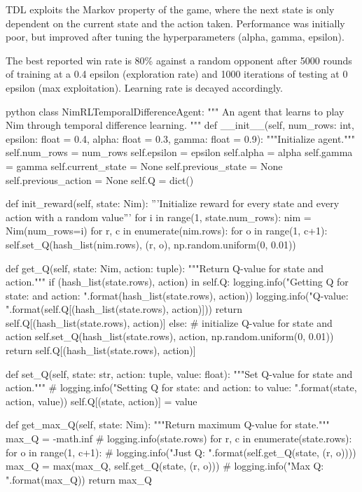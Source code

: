 TDL exploits the Markov property of the game, where the next state is only dependent on the current state and the action taken. Performance was initially poor, but improved after tuning the hyperparameters (alpha, gamma, epsilon).

The best reported win rate is 80\% against a random opponent after 5000 rounds of training at a 0.4 epsilon (exploration rate) and 1000 iterations of testing at 0 epsilon (max exploitation). Learning rate is decayed accordingly.

\begin{mintedbox}{python}
class NimRLTemporalDifferenceAgent:
"""
An agent that learns to play Nim through temporal difference learning.
"""
def __init__(self, num_rows: int, epsilon: float = 0.4, alpha: float = 0.3, gamma: float = 0.9):
    """Initialize agent."""
    self.num_rows = num_rows
    self.epsilon = epsilon
    self.alpha = alpha
    self.gamma = gamma
    self.current_state = None
    self.previous_state = None
    self.previous_action = None
    self.Q = dict()

def init_reward(self, state: Nim):
    '''Initialize reward for every state and every action with a random value'''
    for i in range(1, state.num_rows):
        nim = Nim(num_rows=i)
        for r, c in enumerate(nim.rows):
            for o in range(1, c+1):
                self.set_Q(hash_list(nim.rows), (r, o),
                            np.random.uniform(0, 0.01))

def get_Q(self, state: Nim, action: tuple):
    """Return Q-value for state and action."""
    if (hash_list(state.rows), action) in self.Q:
        logging.info("Getting Q for state: {} and action: {}".format(hash_list(state.rows), action))
        logging.info("Q-value: {}".format(self.Q[(hash_list(state.rows), action)]))
        return self.Q[(hash_list(state.rows), action)]
    else:
        # initialize Q-value for state and action
        self.set_Q(hash_list(state.rows), action, np.random.uniform(0, 0.01))
        return self.Q[(hash_list(state.rows), action)]

def set_Q(self, state: str, action: tuple, value: float):
    """Set Q-value for state and action."""
    # logging.info("Setting Q for state: {} and action: {} to value: {}".format(state, action, value))
    self.Q[(state, action)] = value

def get_max_Q(self, state: Nim):
    """Return maximum Q-value for state."""
    max_Q = -math.inf
    # logging.info(state.rows)
    for r, c in enumerate(state.rows):
        for o in range(1, c+1):
            # logging.info("Just Q: {}".format(self.get_Q(state, (r, o))))
            max_Q = max(max_Q, self.get_Q(state, (r, o)))
    # logging.info("Max Q: {}".format(max_Q))
    return max_Q


\end{mintedbox}
